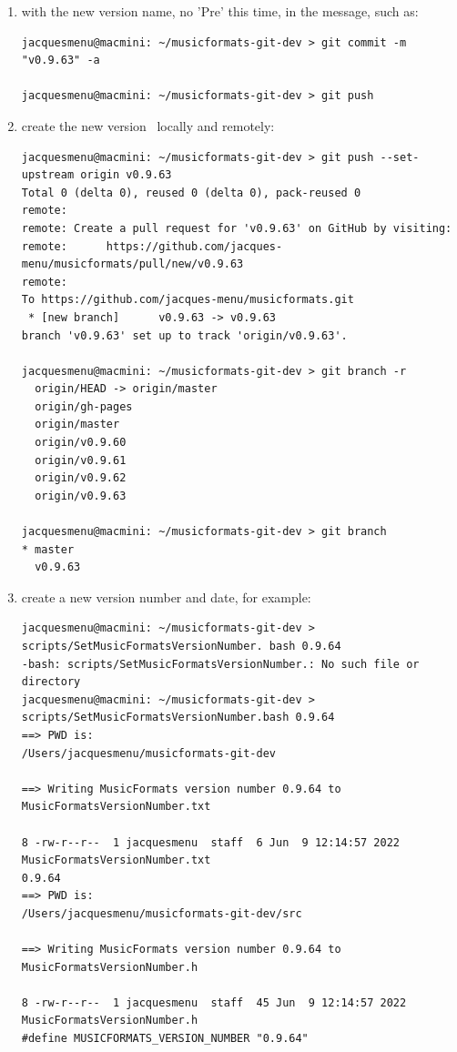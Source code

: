 \begin{enumerate}
\item {} with the new version name, no 'Pre' this time, in the  message, such as:
\begin{lstlisting}[language=Terminal]
jacquesmenu@macmini: ~/musicformats-git-dev > git commit -m "v0.9.63" -a

jacquesmenu@macmini: ~/musicformats-git-dev > git push
\end{lstlisting}


\item create the new version \branch\ locally and remotely:
\begin{lstlisting}[language=Terminal]
jacquesmenu@macmini: ~/musicformats-git-dev > git push --set-upstream origin v0.9.63
Total 0 (delta 0), reused 0 (delta 0), pack-reused 0
remote: 
remote: Create a pull request for 'v0.9.63' on GitHub by visiting:
remote:      https://github.com/jacques-menu/musicformats/pull/new/v0.9.63
remote: 
To https://github.com/jacques-menu/musicformats.git
 * [new branch]      v0.9.63 -> v0.9.63
branch 'v0.9.63' set up to track 'origin/v0.9.63'.

jacquesmenu@macmini: ~/musicformats-git-dev > git branch -r
  origin/HEAD -> origin/master
  origin/gh-pages
  origin/master
  origin/v0.9.60
  origin/v0.9.61
  origin/v0.9.62
  origin/v0.9.63
  
jacquesmenu@macmini: ~/musicformats-git-dev > git branch
* master
  v0.9.63
\end{lstlisting}


\item create a new version number and date, for example:
\begin{lstlisting}[language=TerminalSmall]
jacquesmenu@macmini: ~/musicformats-git-dev > scripts/SetMusicFormatsVersionNumber. bash 0.9.64
-bash: scripts/SetMusicFormatsVersionNumber.: No such file or directory
jacquesmenu@macmini: ~/musicformats-git-dev > scripts/SetMusicFormatsVersionNumber.bash 0.9.64
==> PWD is:
/Users/jacquesmenu/musicformats-git-dev

==> Writing MusicFormats version number 0.9.64 to MusicFormatsVersionNumber.txt

8 -rw-r--r--  1 jacquesmenu  staff  6 Jun  9 12:14:57 2022 MusicFormatsVersionNumber.txt
0.9.64
==> PWD is:
/Users/jacquesmenu/musicformats-git-dev/src

==> Writing MusicFormats version number 0.9.64 to MusicFormatsVersionNumber.h

8 -rw-r--r--  1 jacquesmenu  staff  45 Jun  9 12:14:57 2022 MusicFormatsVersionNumber.h
#define MUSICFORMATS_VERSION_NUMBER "0.9.64"
\end{lstlisting}


\end{enumerate}
